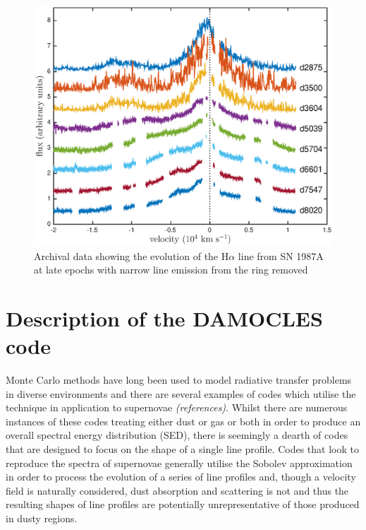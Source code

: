 \documentclass[useAMS,usenatbib,usegraphicx]{mnras}
\begin{document}
\begin{figure}
\includegraphics[trim =45 10 45 15,clip=true,scale=0.51]{Ha_evol_late_1col}
\caption{Archival data showing the evolution of the H$\alpha$ line from SN 1987A at late epochs with narrow line emission from the ring removed}
\label{Ha_evol_late}
\end{figure}

\section{Description of the DAMOCLES code}
\label{code}
Monte Carlo methods have long been used to model radiative transfer problems in diverse environments and there are several examples of codes which utilise the technique in application to supernovae \textit{(references)}.  Whilst there are numerous instances of these codes treating either dust or gas or both in order to produce an overall spectral energy distribution (SED), there is seemingly a dearth of codes that are designed to focus on the shape of a single line profile.  Codes that look to reproduce the spectra of supernovae generally utilise the Sobolev approximation in order to process the evolution of a series of line profiles and, though a velocity field is naturally considered, dust absorption and scattering is not and thus the resulting shapes of line profiles are potentially unrepresentative of those produced in dusty regions.
\end{document}
